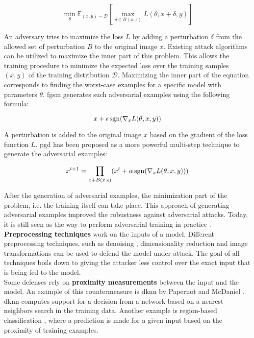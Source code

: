 \begin{equation*}
\min_\theta \mathbb{E}_{(x,y) \sim \mathcal{D}} \left[  \max_{\delta \in B(x,\epsilon)} L(\theta,x+\delta,y)\right]
\end{equation*}

An adversary tries to maximize the loss $L$ by adding a perturbation $\delta$ from the allowed set of perturbation $B$ to the original image $x$. Existing attack algorithms can be utilized to maximize the inner part of this problem. This allows the training procedure to minimize the expected loss over the training samples $(x,y)$ of the training distribution $\mathcal{D}$. Maximizing the inner part of the equation corresponds to finding the worst-case examples for a specific model with parameters $\theta$. \gls{fgsm} \cite{FGSM} generates such adversarial examples using the following formula:

\begin{equation*}
x + \epsilon \operatorname{sgn}(\nabla_xL(\theta,x,y))
\end{equation*}

A perturbation is added to the original image $x$ based on the gradient of the loss function $L$. \gls{pgd} \cite{pgd} has been proposed as a more powerful multi-step technique to generate the adversarial examples:

\begin{equation*}
x^{t+1} = \prod_{x+B(x,\epsilon)} (x^t + \alpha \operatorname{sgn}(\nabla_xL(\theta,x,y)))
\end{equation*}

After the generation of adversarial examples, the minimization part of the problem, i.e. the training itself can take place. This approach of generating adversarial examples improved the robustness against adversarial attacks. Today, it is still seen as the way to perform adversarial training in practice \cite{adversarial_training}.\\ 

\textbf{Preprocessing techniques} work on the inputs of a model. Different preprocessing techniques, such as denoising \cite{denoising}, dimensionality reduction \cite{dimensionality_reduction} and image transformations \cite{image_transformations} can be used to defend the model under attack. The goal of all techniques boils down to giving the attacker less control over the exact input that is being fed to the model.\\

Some defenses rely on \textbf{proximity measurements} between the input and the model. An example of this countermeasure is \gls{dknn} by Papernot and McDaniel \cite{dknn}. \gls{dknn} computes support for a decision from a network based on a nearest neighbors search in the training data. Another example is region-based classification \cite{region-based_classification}, where a prediction is made for a given input based on the proximity of training examples.\\ 

